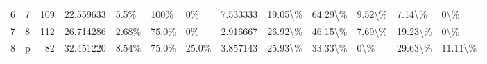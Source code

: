 \begin{tabular}{llrrlllrlllll}
6 &  7 &      109 &   22.559633 &                5.5\% &                                       100\% &                                               0\% &                7.533333 &       19.05\textbackslash \% &         64.29\textbackslash \% &                9.52\textbackslash \% &              7.14\textbackslash \% &           0\textbackslash \% \\
7 &  8 &      112 &   26.714286 &               2.68\% &                                      75.0\% &                                               0\% &                2.916667 &       26.92\textbackslash \% &         46.15\textbackslash \% &                7.69\textbackslash \% &             19.23\textbackslash \% &           0\textbackslash \% \\
8 &  p &       82 &   32.451220 &               8.54\% &                                      75.0\% &                                            25.0\% &                3.857143 &       25.93\textbackslash \% &         33.33\textbackslash \% &                   0\textbackslash \% &             29.63\textbackslash \% &       11.11\textbackslash \% \\
\bottomrule
\end{tabular}
